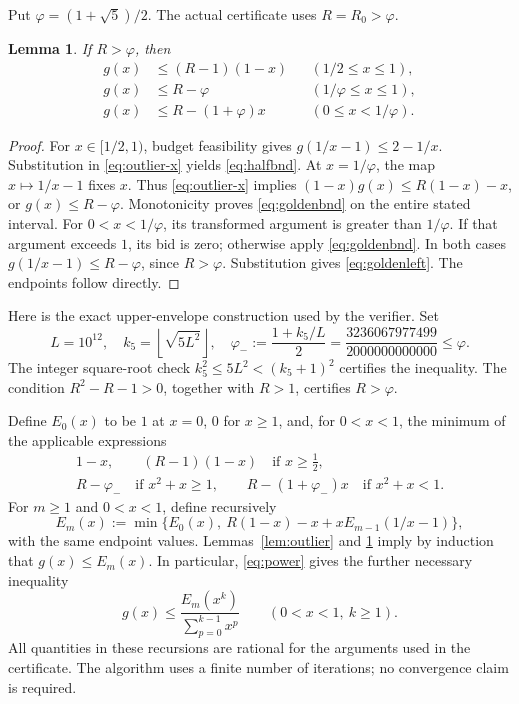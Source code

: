 \documentclass[11pt]{article}
\numberwithin{equation}{section}
\newtheorem{lemma}[theorem]{Lemma}
\theoremstyle{definition}
\newcommand{\Rzero}{R_0}
\newcommand{\fl}[1]{\left\lfloor#1\right\rfloor}
\begin{document}
Put $\varphi=(1+\sqrt5)/2$. The actual certificate uses $R=\Rzero>\varphi$.

\begin{lemma}\label{lem:golden}
If $R>\varphi$, then
\begin{align}
 g(x)&\le (R-1)(1-x) &&(1/2\le x\le1),\label{eq:halfbnd}\\
 g(x)&\le R-\varphi &&(1/\varphi\le x\le1),\label{eq:goldenbnd}\\
 g(x)&\le R-(1+\varphi)x &&(0\le x<1/\varphi).
 \label{eq:goldenleft}
\end{align}
\end{lemma}
\begin{proof}
For $x\in[1/2,1)$, budget feasibility gives
$g(1/x-1)\le2-1/x$. Substitution in \eqref{eq:outlier-x} yields
\eqref{eq:halfbnd}. At $x=1/\varphi$, the map $x\mapsto1/x-1$ fixes $x$.
Thus \eqref{eq:outlier-x} implies
$(1-x)g(x)\le R(1-x)-x$, or $g(x)\le R-\varphi$.
Monotonicity proves \eqref{eq:goldenbnd} on the entire stated interval.
For $0<x<1/\varphi$, its transformed argument is greater than $1/\varphi$.
If that argument exceeds $1$, its bid is zero; otherwise apply
\eqref{eq:goldenbnd}. In both cases
$g(1/x-1)\le R-\varphi$, since $R>\varphi$. Substitution gives
\eqref{eq:goldenleft}. The endpoints follow directly.
\end{proof}

Here is the exact upper-envelope construction used by the verifier. Set
\begin{equation}\label{eq:philow}
 L=10^{12},\quad k_5=\fl{\sqrt{5L^2}},\quad
 \varphi_-:=\frac{1+k_5/L}{2}
 =\frac{3236067977499}{2000000000000}\le\varphi.
\end{equation}
The integer square-root check $k_5^2\le5L^2<(k_5+1)^2$ certifies the
inequality. The condition $R^2-R-1>0$, together with $R>1$, certifies
$R>\varphi$.

Define $E_0(x)$ to be $1$ at $x=0$, $0$ for $x\ge1$, and, for $0<x<1$, the
minimum of the applicable expressions
\begin{equation}\label{eq:envelope-initial}
\begin{gathered}
 1-x,\qquad (R-1)(1-x)\quad\text{if }x\ge\tfrac12,\\
 R-\varphi_-\quad\text{if }x^2+x\ge1,\qquad
 R-(1+\varphi_-)x\quad\text{if }x^2+x<1.
\end{gathered}
\end{equation}
For $m\ge1$ and $0<x<1$, define recursively
\begin{equation}\label{eq:envelope-rec}
 E_m(x):=\min\{E_0(x),\ R(1-x)-x+xE_{m-1}(1/x-1)\},
\end{equation}
with the same endpoint values. Lemmas~\ref{lem:outlier} and
\ref{lem:golden} imply by induction that $g(x)\le E_m(x)$.
In particular, \eqref{eq:power} gives the further necessary inequality
\begin{equation}\label{eq:envelope-power}
 g(x)\le
 \frac{E_m(x^k)}{\sum_{p=0}^{k-1}x^p}
 \qquad(0<x<1,\ k\ge1).
\end{equation}
All quantities in these recursions are rational for the arguments used in
the certificate. The algorithm uses a finite number of iterations; no
convergence claim is required.
\end{document}
